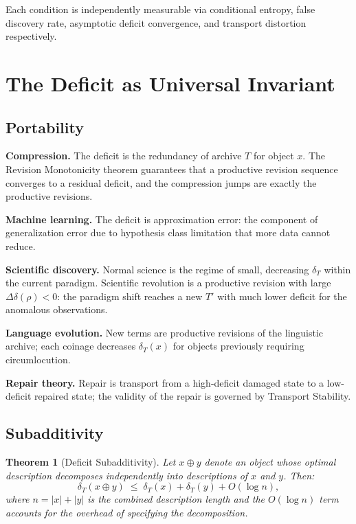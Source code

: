 \documentclass[12pt, a4paper]{article}
\theoremstyle{plain}
\newtheorem{theorem}{Theorem}[section]
\theoremstyle{definition}
\theoremstyle{remark}
\newcommand{\Ddelta}{\Delta\delta}
\begin{document}
Each condition is independently measurable via conditional entropy, false
discovery rate, asymptotic deficit convergence, and transport distortion
respectively.

\section{The Deficit as Universal Invariant}
\label{sec:deficit-universal}

\subsection{Portability}

\noindent\textbf{Compression.} The deficit is the redundancy of archive $T$
for object $x$. The Revision Monotonicity theorem guarantees that a productive
revision sequence converges to a residual deficit, and the compression jumps
are exactly the productive revisions.

\noindent\textbf{Machine learning.} The deficit is approximation error:
the component of generalization error due to hypothesis class limitation that
more data cannot reduce.

\noindent\textbf{Scientific discovery.} Normal science is the regime of small,
decreasing $\delta_T$ within the current paradigm. Scientific revolution is
a productive revision with large $\Ddelta(\rho)<0$: the paradigm shift reaches
a new $T'$ with much lower deficit for the anomalous observations.

\noindent\textbf{Language evolution.} New terms are productive revisions of
the linguistic archive; each coinage decreases $\delta_T(x)$ for objects
previously requiring circumlocution.

\noindent\textbf{Repair theory.} Repair is transport from a high-deficit
damaged state to a low-deficit repaired state; the validity of the repair
is governed by Transport Stability.

\subsection{Subadditivity}

\begin{theorem}[Deficit Subadditivity]
\label{thm:subadditive}
Let $x\oplus y$ denote an object whose optimal description decomposes
independently into descriptions of $x$ and $y$. Then:
\[
  \delta_T(x\oplus y) \;\le\; \delta_T(x) + \delta_T(y) + O(\log n),
\]
where $n=|x|+|y|$ is the combined description length and the $O(\log n)$
term accounts for the overhead of specifying the decomposition.
\end{theorem}
\end{document}
